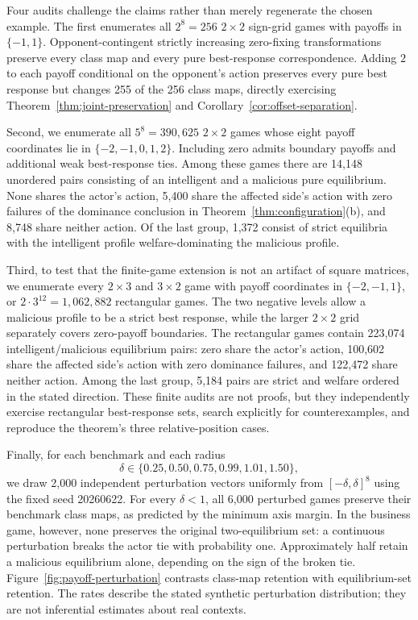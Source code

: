 \documentclass[a4paper,fleqn]{cas-dc}
\theoremstyle{remark}
\begin{document}
Four audits challenge the claims rather than merely regenerate the chosen
example.  The first enumerates all $2^8=256$ $2\times2$ sign-grid games with
payoffs in $\{-1,1\}$. Opponent-contingent strictly increasing zero-fixing
transformations preserve every
class map and every pure best-response correspondence.  Adding $2$ to each
payoff conditional on the opponent's action preserves every pure best response
but changes 255 of the 256 class maps, directly exercising
Theorem~\ref{thm:joint-preservation} and Corollary~\ref{cor:offset-separation}.

Second, we enumerate all $5^8=390{,}625$ $2\times2$ games whose eight payoff coordinates lie in $\{-2,-1,0,1,2\}$. Including zero admits boundary payoffs and additional weak best-response ties. Among these games there are 14,148 unordered pairs consisting of an intelligent and a malicious pure equilibrium. None shares the actor's action, 5,400 share the affected side's action with zero failures of the dominance conclusion in Theorem~\ref{thm:configuration}(b), and 8,748 share neither action. Of the last group, 1,372 consist of strict equilibria with the intelligent profile welfare-dominating the malicious profile.

Third, to test that the finite-game extension is not an artifact of square matrices, we enumerate every $2\times3$ and $3\times2$ game with payoff coordinates in $\{-2,-1,1\}$, or $2\cdot3^{12}=1{,}062{,}882$ rectangular games. The two negative levels allow a malicious profile to be a strict best response, while the larger $2\times2$ grid separately covers zero-payoff boundaries. The rectangular games contain 223,074 intelligent/malicious equilibrium pairs: zero share the actor's action, 100,602 share the affected side's action with zero dominance failures, and 122,472 share neither action. Among the last group, 5,184 pairs are strict and welfare ordered in the stated direction. These finite audits are not proofs, but they independently exercise rectangular best-response sets, search explicitly for counterexamples, and reproduce the theorem's three relative-position cases.

Finally, for each benchmark and each radius
\[
\delta\in\{0.25,0.50,0.75,0.99,1.01,1.50\},
\]
we draw 2,000 independent perturbation vectors uniformly from
$[-\delta,\delta]^8$ using the fixed seed 20260622. For every $\delta<1$, all
6,000 perturbed games preserve their benchmark class maps, as predicted by the
minimum axis margin. In the business game, however, none preserves the original
two-equilibrium set: a continuous perturbation breaks the actor tie with
probability one. Approximately half retain a malicious equilibrium alone,
depending on the sign of the broken tie. Figure~\ref{fig:payoff-perturbation}
contrasts class-map retention with equilibrium-set retention. The rates describe
the stated synthetic perturbation distribution; they are not inferential
estimates about real contexts.
\end{document}
